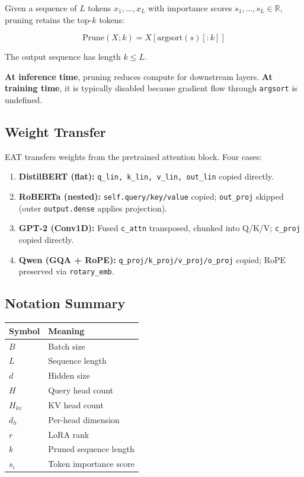 Given a sequence of $L$ tokens $x_1, \dots, x_L$ with importance scores 
$s_1, \dots, s_L \in \mathbb{R}$, pruning retains the top-$k$ tokens:

\[
\text{Prune}(X; k) = X[\text{argsort}(s)[:k]]
\tag{3.6}
\]

The output sequence has length $k \leq L$.

\textbf{At inference time}, pruning reduces compute for downstream layers. 
\textbf{At training time}, it is typically disabled because gradient flow through 
\texttt{argsort} is undefined.

\subsection{Weight Transfer}

EAT transfers weights from the pretrained attention block. Four cases:

\begin{enumerate}
\item \textbf{DistilBERT (flat):} \texttt{q\_lin, k\_lin, v\_lin, out\_lin} copied directly.
\item \textbf{RoBERTa (nested):} \texttt{self.query/key/value} copied; \texttt{out\_proj} skipped
  (outer \texttt{output.dense} applies projection).
\item \textbf{GPT-2 (Conv1D):} Fused \texttt{c\_attn} transposed, chunked into Q/K/V;
  \texttt{c\_proj} copied directly.
\item \textbf{Qwen (GQA + RoPE):} \texttt{q\_proj/k\_proj/v\_proj/o\_proj} copied; RoPE
  preserved via \texttt{rotary\_emb}.

\end{enumerate}
\subsection{Notation Summary}

\begin{table}[H]
\centering
\small
\begin{tabular}{ll}
\toprule
\textbf{Symbol} & \textbf{Meaning} \\
\midrule
$B$ & Batch size \\
$L$ & Sequence length \\
$d$ & Hidden size \\
$H$ & Query head count \\
$H_{kv}$ & KV head count \\
$d_h$ & Per-head dimension \\
$r$ & LoRA rank \\
$k$ & Pruned sequence length \\
$s_i$ & Token importance score \\
\bottomrule
\end{tabular}
\end{table}

